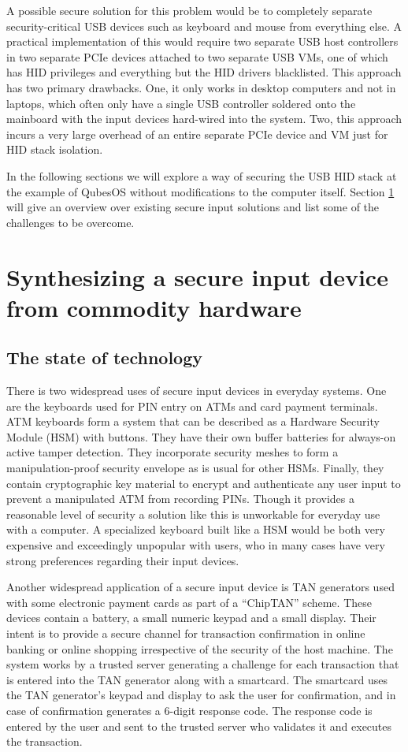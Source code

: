 \documentclass[12pt,a4paper,notitlepage]{article}
\begin{document}
A possible secure solution for this problem would be to completely separate security-critical USB devices such as
keyboard and mouse from everything else. A practical implementation of this would require two separate USB host
controllers in two separate PCIe devices attached to two separate USB VMs, one of which has HID privileges and
everything but the HID drivers blacklisted. This approach has two primary drawbacks. One, it only works in desktop
computers and not in laptops, which often only have a single USB controller soldered onto the mainboard with the input
devices hard-wired into the system. Two, this approach incurs a very large overhead of an entire separate PCIe device
and VM just for HID stack isolation.

In the following sections we will explore a way of securing the USB HID stack at the example of QubesOS without
modifications to the computer itself. Section \ref{commodityhardware} will give an overview over existing secure input
solutions and list some of the challenges to be overcome.

\section{Synthesizing a secure input device from commodity hardware}
\label{commodityhardware}
\subsection{The state of technology}
There is two widespread uses of secure input devices in everyday systems. One are the keyboards used for PIN entry on
ATMs and card payment terminals. ATM keyboards form a system that can be described as a Hardware Security Module (HSM)
with buttons. They have their own buffer batteries for always-on active tamper detection. They incorporate security
meshes to form a manipulation-proof security envelope as is usual for other HSMs. Finally, they contain cryptographic
key material to encrypt and authenticate any user input to prevent a manipulated ATM from recording PINs. Though it
provides a reasonable level of security a solution like this is unworkable for everyday use with a computer. A
specialized keyboard built like a HSM would be both very expensive and exceedingly unpopular with users, who in many
cases have very strong preferences regarding their input devices.

Another widespread application of a secure input device is TAN generators used with some electronic payment cards as
part of a ``ChipTAN'' scheme. These devices contain a battery, a small numeric keypad and a small display. Their intent
is to provide a secure channel for transaction confirmation in online banking or online shopping irrespective of the
security of the host machine. The system works by a trusted server generating a challenge for each transaction that is
entered into the TAN generator along with a smartcard. The smartcard uses the TAN generator's keypad and display to ask
the user for confirmation, and in case of confirmation generates a 6-digit response code. The response code is entered
by the user and sent to the trusted server who validates it and executes the transaction.
\end{document}

